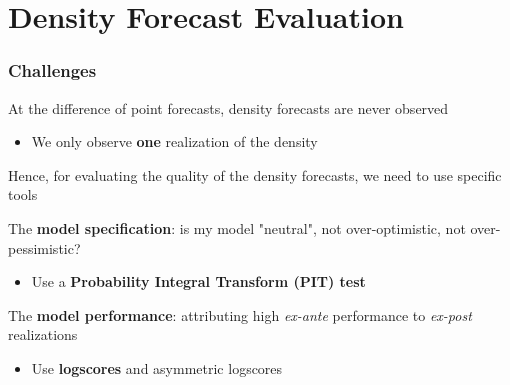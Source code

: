 \documentclass{beamer}
\newenvironment{wideitemize}{\itemize\addtolength{\itemsep}{10pt}}{\enditemize}
\begin{document}
    

\section{Density Forecast Evaluation}
    

\begin{frame}
  \frametitle{Challenges}
  \begin{wideitemize}
  \item At the difference of point forecasts, density forecasts are never observed
    \begin{itemize}
    \item We only observe \textbf{one} realization of the density
    \end{itemize}
  \item Hence, for evaluating the quality of the density forecasts, we need to use specific tools
   \item The \textbf{model specification}: is my model "neutral", not over-optimistic, not over-pessimistic?
      \begin{itemize}
      \item Use a \textbf{Probability Integral Transform (PIT) test}
      \end{itemize}      
    \item The \textbf{model performance}: attributing high \emph{ex-ante} performance to \emph{ex-post} realizations
      \begin{itemize}
      \item Use \textbf{logscores} and asymmetric logscores
      \end{itemize}
  \end{wideitemize}
\end{frame}
\end{document}
